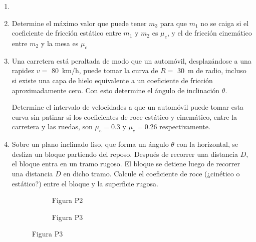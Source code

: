 \documentclass[letterpaper,11pt]{article}
\begin{document}
\vspace{-1cm}
\begin{enumerate}\setlength{\itemsep}{0.4cm}


\item[]

\item Determine el máximo valor que puede tener $m_3$ para que $m_1$ no se caiga si el coeficiente de fricción estático entre $m_1$ y $m_2$ es $\mu_e$, y el de fricción cinemático entre $m_2$ y la mesa es $\mu_c$

\begin{figure}[h]
    \centering
    
\end{figure}

\item Una carretera está peraltada de modo que un automóvil, desplazándose a una rapidez $v=$ \SI{80}{\km/\hour}, puede tomar la curva de $R=$ \SI{30}{m} de radio, incluso si existe una capa de hielo equivalente a un coeficiente de fricción aproximadamente cero. Con esto determine el ángulo de inclinación $\theta$.

Determine el intervalo de velocidades a que un automóvil puede tomar esta curva sin patinar si los coeficientes de roce estático y cinemático, entre la carretera y las ruedas, son $\mu_e = 0.3$ y $\mu_c = 0.26$ respectivamente.

\item Sobre un plano inclinado liso, que forma un ángulo $\theta$ con la horizontal, se desliza un bloque partiendo del reposo. Después de recorrer una distancia $D$, el bloque entra en un tramo rugoso. El bloque se detiene luego de recorrer una distancia $D$ en dicho tramo. Calcule el coeficiente de roce (¿cinético o estático?) entre el bloque y la superficie rugosa.

\begin{figure}[H]
    \centering
    \begin{subfigure}[t]{0.45\textwidth}
        
        \caption*{Figura P2}
    \end{subfigure}
    \hspace{0.3em}
    \begin{subfigure}[t]{0.45\textwidth}
        
        \caption*{Figura P3}
    \end{subfigure}
\end{figure}


\end{enumerate}
\end{document}

